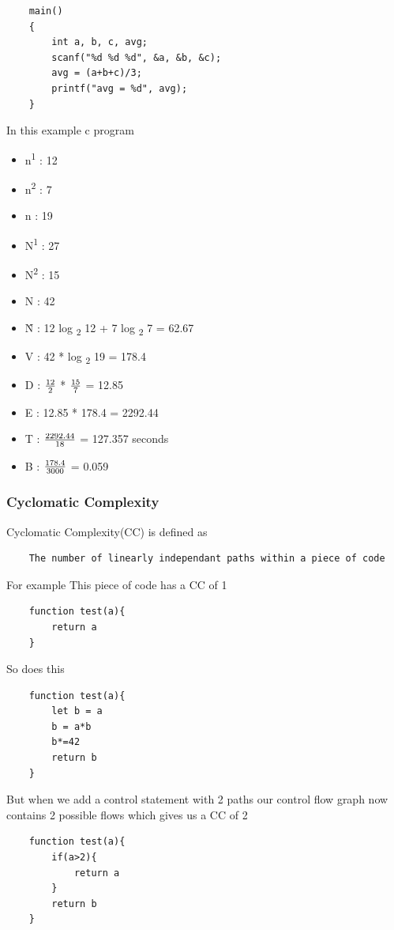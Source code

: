 \begin{verbatim}
    main()
    {
        int a, b, c, avg;
        scanf("%d %d %d", &a, &b, &c);
        avg = (a+b+c)/3;
        printf("avg = %d", avg);
    }
\end{verbatim}
In this example c program 
\begin{itemize}
    \item n\textsuperscript{1} : 12
    \item n\textsuperscript{2} : 7
    \item n : 19
    \item N\textsuperscript{1} : 27
    \item N\textsuperscript{2} : 15
    \item N : 42
    \item \^{N} : 12 log \textsubscript{2} 12 + 7 log \textsubscript{2} 7 = 62.67
    \item V : 42 * log \textsubscript{2} 19 = 178.4
    \item D : $\frac{\text{12}}{\text{2}}$ * $\frac{\text{15}}{\text{7}}$ = 12.85
    \item E : 12.85 * 178.4 = 2292.44
    \item T : $\frac{\text{2292.44}}{\text{18}}$ = 127.357 seconds
    \item B : $\frac{\text{178.4}}{\text{3000}}$ = 0.059
\end{itemize}

\subsubsection{Cyclomatic Complexity}
Cyclomatic Complexity(CC) is defined as 
\begin{verbatim}
    The number of linearly independant paths within a piece of code
\end{verbatim}
For example 
\newline
This piece of code has a CC of 1

\begin{verbatim}
    function test(a){
        return a
    }
\end{verbatim}
So does this
\begin{verbatim}
    function test(a){
        let b = a
        b = a*b
        b*=42
        return b
    }
\end{verbatim}
But when we add a control statement with 2 paths our control flow graph now contains 2 possible flows which gives us a CC of 2
\begin{verbatim}
    function test(a){
        if(a>2){
            return a
        }
        return b
    }
\end{verbatim}

